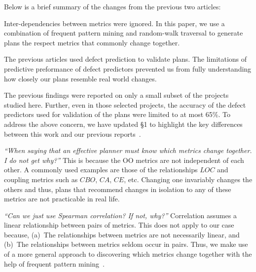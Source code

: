 Below is a brief summary of the changes from the previous two articles:
\be
\item Inter-dependencies between metrics were ignored. In this paper, we use a combination of frequent pattern mining and random-walk traversal to generate plans the respect metrics that commonly change together.  
\item The previous articles used defect prediction to validate plans. The limitations of predictive preformance of defect predictors prevented us from fully understanding how closely our plans resemble real world changes. 
\item The previous findings were reported on only a small subset of the projects studied here. Further, even in those selected projects, the accuracy of the defect predictors used for validation of the plans were limited to at most 65\%. 
\ee 
%
To address the above concern, we have updated \S1 to highlight the key differences between this work and our previous reports~.  

\be
\item \textit{``When saying that an effective planner must know which metrics change together. I do not get why?''} This is because the OO metrics are not independent of each other. A commonly used examples are those of the relationships $\mathit{LOC}$ and coupling metrics such as $\mathit{CBO}$, $\mathit{CA}$, $\mathit{CE}$, etc. Changing one invariably changes the others and thus, plans that recommend changes in isolation to any of these metrics are not practicable in real life.

\item \textit{``Can we just use Spearman correlation? If not, why?''} Correlation assumes a linear relationship between pairs of metrics. This does not apply to our case because, (a)~The relationships between metrics are not necessarily linear, and (b)~The relationships between metrics seldom occur in pairs. Thus, we make use of a more general approach to discovering which metrics change together with the help of frequent pattern mining~.

